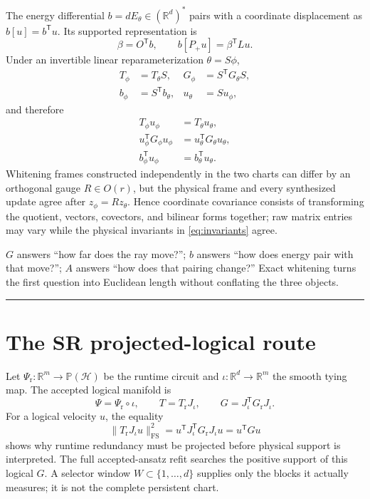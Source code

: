 \documentclass[10pt,twocolumn]{article}
\theoremstyle{definition}
\theoremstyle{remark}
\newcommand{\conceptbreak}{\par\vspace{0.45em}\noindent\textcolor{navy!55}{\rule{\columnwidth}{0.35pt}}\vspace{0.35em}\par}
\newcommand{\R}{\mathbb R}
\newcommand{\Hh}{\mathcal H}
\newcommand{\Pj}{\mathbb P}
\newcommand{\FS}{\mathrm{FS}}
\newcommand{\rt}{\mathrm r}
\begin{document}
The energy differential $b=dE_\theta\in(\R^d)^*$ pairs with a coordinate displacement as $b[u]=b^{\mathsf T}u$.  Its supported representation is
\begin{equation}
 \beta=O^{\mathsf T}b,\qquad b[P_+u]=\beta^{\mathsf T}Lu.
 \label{eq:covectoranalysis}
\end{equation}
Under an invertible linear reparameterization $\theta=S\phi$,
\begin{align}
 T_\phi&=T_\theta S,&
 G_\phi&=S^{\mathsf T}G_\theta S,\nonumber\\
 b_\phi&=S^{\mathsf T}b_\theta,&
 u_\theta&=Su_\phi,
 \label{eq:covariance}
\end{align}
and therefore
\begin{align}
 T_\phi u_\phi&=T_\theta u_\theta,\nonumber\\
 u_\phi^{\mathsf T}G_\phi u_\phi&=u_\theta^{\mathsf T}G_\theta u_\theta,\nonumber\\
 b_\phi^{\mathsf T}u_\phi&=b_\theta^{\mathsf T}u_\theta.
 \label{eq:invariants}
\end{align}
Whitening frames constructed independently in the two charts can differ by an orthogonal gauge $R\in O(r)$, but the physical frame and every synthesized update agree after $z_\phi=Rz_\theta$.  Hence coordinate covariance consists of transforming the quotient, vectors, covectors, and bilinear forms together; raw matrix entries may vary while the physical invariants in \eqref{eq:invariants} agree.

\begin{physbox}
$G$ answers ``how far does the ray move?''; $b$ answers ``how does energy pair with that move?''; $A$ answers ``how does that pairing change?''  Exact whitening turns the first question into Euclidean length without conflating the three objects.
\end{physbox}

\conceptbreak

\section{The SR projected-logical route}
\label{sec:sr}

Let $\Psi_{\rt}:\R^m\to\Pj(\Hh)$ be the runtime circuit and $\iota:\R^d\to\R^m$ the smooth tying map.  The accepted logical manifold is
\begin{equation}
 \Psi=\Psi_{\rt}\circ\iota,\qquad
 T=T_{\rt}J_\iota,\qquad
 G=J_\iota^{\mathsf T}G_{\rt}J_\iota.
 \label{eq:logicalpullback}
\end{equation}
For a logical velocity $u$, the equality
\begin{equation}
 \|T_{\rt}J_\iota u\|_{\FS}^2
 =u^{\mathsf T}J_\iota^{\mathsf T}G_{\rt}J_\iota u
 =u^{\mathsf T}Gu
 \label{eq:logicalinvariant}
\end{equation}
shows why runtime redundancy must be projected before physical support is interpreted.  The full accepted-ansatz refit searches the positive support of this logical $G$.  A selector window $W\subset\{1,\ldots,d\}$ supplies only the blocks it actually measures; it is not the complete persistent chart.
\end{document}
